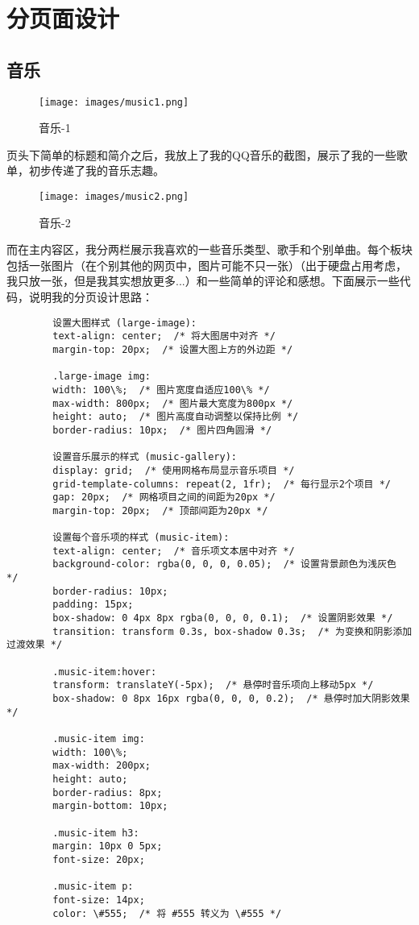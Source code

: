 \documentclass[supercite]{Experimental_Report}
\theoremstyle{definition}
\begin{document}
\section{分页面设计}
	\subsection{音乐}
	
	\begin{figure}[h]
		\begin{center}
			\texttt{[image: images/music1.png]}
			\caption{音乐-1}
			\label{fig3-1}
		\end{center}
	\end{figure}
	
	页头下简单的标题和简介之后，我放上了我的QQ音乐的截图，展示了我的一些歌单，初步传递了我的音乐志趣。
	
	\begin{figure}[h]
		\begin{center}
			\texttt{[image: images/music2.png]}
			\caption{音乐-2}
			\label{fig3-2}
		\end{center}
	\end{figure}
	
	而在主内容区，我分两栏展示我喜欢的一些音乐类型、歌手和个别单曲。每个板块包括一张图片（在个别其他的网页中，图片可能不只一张）（出于硬盘占用考虑，我只放一张，但是我其实想放更多...）和一些简单的评论和感想。下面展示一些代码，说明我的分页设计思路：
	
	\begin{verbatim}
		设置大图样式 (large-image):
		text-align: center;  /* 将大图居中对齐 */
		margin-top: 20px;  /* 设置大图上方的外边距 */
		
		.large-image img:
		width: 100\%;  /* 图片宽度自适应100\% */
		max-width: 800px;  /* 图片最大宽度为800px */
		height: auto;  /* 图片高度自动调整以保持比例 */
		border-radius: 10px;  /* 图片四角圆滑 */
		
		设置音乐展示的样式 (music-gallery):
		display: grid;  /* 使用网格布局显示音乐项目 */
		grid-template-columns: repeat(2, 1fr);  /* 每行显示2个项目 */
		gap: 20px;  /* 网格项目之间的间距为20px */
		margin-top: 20px;  /* 顶部间距为20px */
		
		设置每个音乐项的样式 (music-item):
		text-align: center;  /* 音乐项文本居中对齐 */
		background-color: rgba(0, 0, 0, 0.05);  /* 设置背景颜色为浅灰色 */
		border-radius: 10px;
		padding: 15px;
		box-shadow: 0 4px 8px rgba(0, 0, 0, 0.1);  /* 设置阴影效果 */
		transition: transform 0.3s, box-shadow 0.3s;  /* 为变换和阴影添加过渡效果 */
		
		.music-item:hover:
		transform: translateY(-5px);  /* 悬停时音乐项向上移动5px */
		box-shadow: 0 8px 16px rgba(0, 0, 0, 0.2);  /* 悬停时加大阴影效果 */
		
		.music-item img:
		width: 100\%;
		max-width: 200px;
		height: auto;
		border-radius: 8px;
		margin-bottom: 10px;
		
		.music-item h3:
		margin: 10px 0 5px;
		font-size: 20px;
		
		.music-item p:
		font-size: 14px;
		color: \#555;  /* 将 #555 转义为 \#555 */
		
	\end{verbatim}
	
\end{document}
